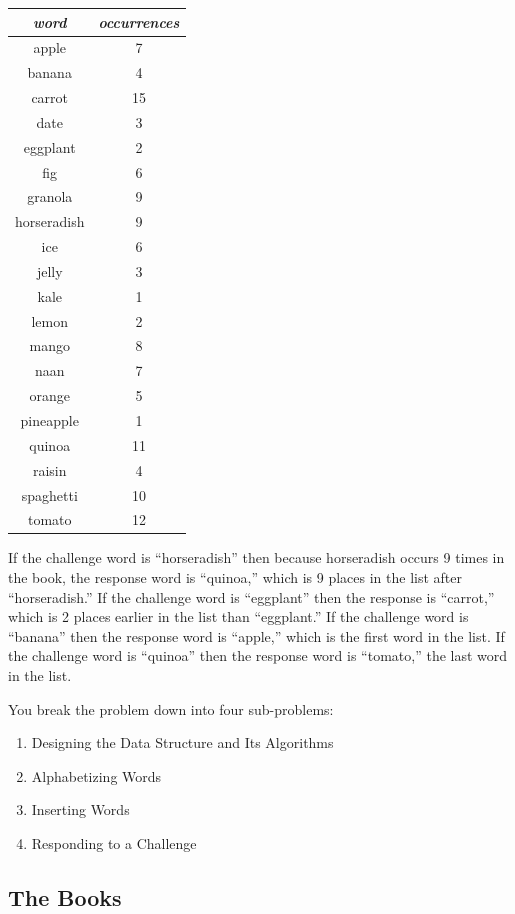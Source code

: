 \begin{center}
\begin{tabular}{cc}
\textit{word} & \textit{occurrences} \\ \hline
apple       & 7 \\
banana      & 4 \\
carrot      & 15 \\
date        & 3 \\
eggplant    & 2 \\
fig         & 6 \\
granola     & 9 \\
horseradish & 9 \\
ice         & 6 \\
jelly       & 3 \\
kale        & 1 \\
lemon       & 2 \\
mango       & 8 \\
naan        & 7 \\
orange      & 5 \\
pineapple   & 1 \\
quinoa      & 11 \\
raisin      & 4 \\
spaghetti   & 10 \\
tomato      & 12 \\
\end{tabular}
\end{center}
If the challenge word is ``horseradish'' then because horseradish occurs 9
times in the book, the response word is ``quinoa,'' which is 9 places in the
list after ``horseradish.'' If the challenge word is ``eggplant'' then the
response is ``carrot,'' which is 2 places earlier in the list than
``eggplant.'' If the challenge word is ``banana'' then the response word is
``apple,'' which is the first word in the list. If the challenge word is
``quinoa'' then the response word is ``tomato,'' the last word in the list.

You break the problem down into four sub-problems:

\begin{enumerate}
\item Designing the Data Structure and Its Algorithms
\item Alphabetizing Words
\item Inserting Words
\item Responding to a Challenge
\end{enumerate}

\subsection*{The Books}

